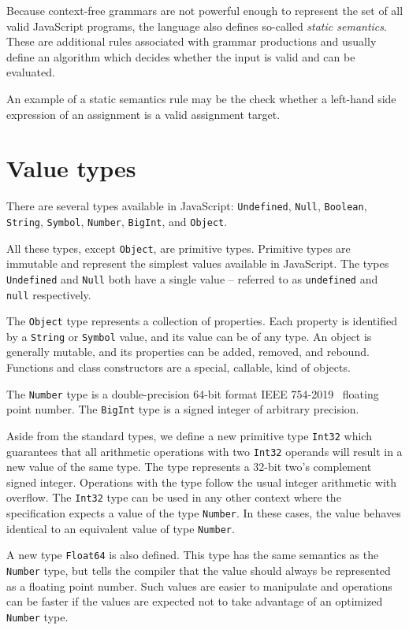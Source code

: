 Because context-free grammars are not powerful enough to represent the set of all valid JavaScript programs, the language also defines so-called \textit{static semantics}. These are additional rules associated with grammar productions and usually define an algorithm which decides whether the input is valid and can be evaluated.

An example of a static semantics rule may be the check whether a left-hand side expression of an assignment is a valid assignment target.


\section{Value types}\label{lang:types}

There are several types available in JavaScript: \texttt{Undefined}, \texttt{Null}, \texttt{Boolean}, \texttt{String}, \texttt{Symbol}, \texttt{Number}, \texttt{BigInt}, and \texttt{Object}.

All these types, except \texttt{Object}, are primitive types. Primitive types are immutable and represent the simplest values available in JavaScript. The types \texttt{Undefined} and \texttt{Null} both have a single value -- referred to as \texttt{undefined} and \texttt{null} respectively.

The \texttt{Object} type represents a collection of properties. Each property is identified by a \texttt{String} or \texttt{Symbol} value, and its value can be of any type. An object is generally mutable, and its properties can be added, removed, and rebound. Functions and class constructors are a special, callable, kind of objects.

The \texttt{Number} type is a double-precision 64-bit format IEEE 754-2019~\cite{ieee754} floating point number. The \texttt{BigInt} type is a signed integer of arbitrary precision.

Aside from the standard types, we define a new primitive type \texttt{Int32} which guarantees that all arithmetic operations with two \texttt{Int32} operands will result in a new value of the same type. The type represents a 32-bit two's complement signed integer. Operations with the type follow the usual integer arithmetic with overflow. The \texttt{Int32} type can be used in any other context where the specification expects a value of the type \texttt{Number}. In these cases, the value behaves identical to an equivalent value of type \texttt{Number}.

A new type \texttt{Float64} is also defined. This type has the same semantics as the \texttt{Number} type, but tells the compiler that the value should always be represented as a floating point number. Such values are easier to manipulate and operations can be faster if the values are expected not to take advantage of an optimized \texttt{Number} type.

